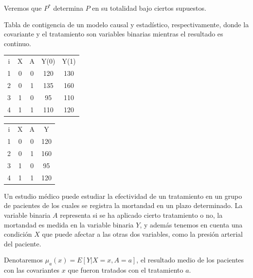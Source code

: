 Veremos que $P^*$ determina $P$ en
su totalidad bajo ciertos supuestos.

\begin{ejemplo}
	Tabla de contigencia de un modelo causal y estadístico, respectivamente, donde la covariante y
	el tratamiento son variables binarias mientras el resultado es continuo.

	\vspace{0.5em}
	\begin{minipage}{0.45\textwidth}
		\centering
		\begin{tabular}{ C | C C | C C }
			i & X & A & Y(0) & Y(1) \\
			1 & 0 & 0 & 120  & 130  \\
			2 & 0 & 1 & 135  & 160  \\
			3 & 1 & 0 & 95   & 110  \\
			4 & 1 & 1 & 110  & 120
		\end{tabular}
	\end{minipage}
	\hfill
	\begin{minipage}{0.45\textwidth}
		\centering
		\begin{tabular}{ C | C C | C }
			i & X & A & Y   \\
			1 & 0 & 0 & 120 \\
			2 & 0 & 1 & 160 \\
			3 & 1 & 0 & 95  \\
			4 & 1 & 1 & 120
		\end{tabular}
	\end{minipage}
\end{ejemplo}


\begin{ejemplo} %
	Un estudio médico puede estudiar la efectividad de un tratamiento en un
	grupo de pacientes de los cuales se registra la mortandad en un plazo determinado.
	La variable binaria $A$ representa si se ha aplicado cierto tratamiento o no,
	la mortandad es medida en la variable binaria $Y$,
	y además tenemos en cuenta una condición $X$ que puede afectar a las otras
	dos variables, como la presión arterial del paciente.
\end{ejemplo}

\begin{notac}
	Denotaremos $\mu_a(x) = E[Y| X = x, A = a]$, el resultado medio de los pacientes con las covariantes $x$ que fueron
	tratados con el tratamiento $a$.
\end{notac}

